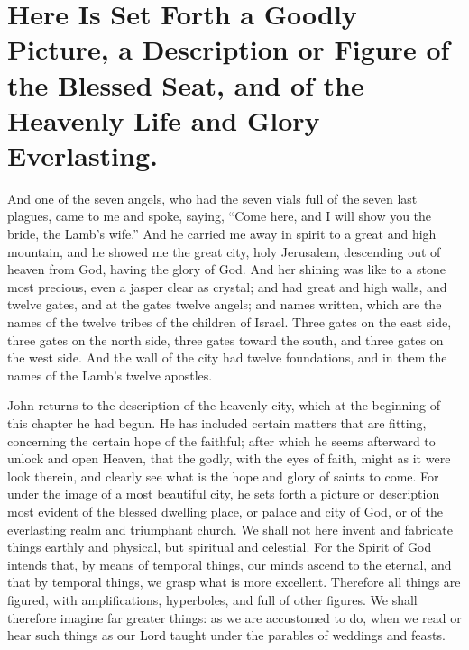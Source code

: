\chapter[Sermon 93. Here Is Set Forth a Goodly Picture, a Description or Figure of the Blessed Seat, and of the Heavenly Life and Glory Everlasting.]{Here Is Set Forth a Goodly Picture, a Description or Figure of the Blessed Seat, and of the Heavenly Life and Glory Everlasting.}
\label{sermon:093}

And one of the seven angels, who had the seven vials full of the seven last plagues, came to me and spoke, saying, “Come here, and I will show you the bride, the Lamb’s wife.” And he carried me away in spirit to a great and high mountain, and he showed me the great city, holy Jerusalem, descending out of heaven from God, having the glory of God. And her shining was like to a stone most precious, even a jasper clear as crystal; and had great and high walls, and twelve gates, and at the gates twelve angels; and names written, which are the names of the twelve tribes of the children of Israel. Three gates on the east side, three gates on the north side, three gates toward the south, and three gates on the west side. And the wall of the city had twelve foundations, and in them the names of the Lamb’s twelve apostles.

John returns to the description of the heavenly city, which at the beginning of this chapter he had begun. He has included certain matters that are fitting, concerning the certain hope of the faithful; after which he seems afterward to unlock and open Heaven, that the godly, with the eyes of faith, might as it were look therein, and clearly see what is the hope and glory of saints to come. For under the image of a most beautiful city, he sets forth a picture or description most evident of the blessed dwelling place, or palace and city of God, or of the everlasting realm and triumphant church. We shall not here invent and fabricate things earthly and physical, but spiritual and celestial. For the Spirit of God intends that, by means of temporal things, our minds ascend to the eternal, and that by temporal things, we grasp what is more excellent. Therefore all things are figured, with amplifications, hyperboles, and full of other figures. We shall therefore imagine far greater things: as we are accustomed to do, when we read or hear such things as our Lord taught under the parables of weddings and feasts.

